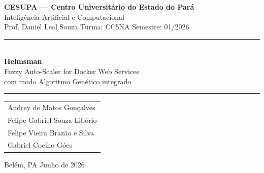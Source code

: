 \documentclass[12pt, a4paper]{article}
\begin{document}
\begin{titlepage}
  \thispagestyle{empty}
  \centering

  \vspace*{1.5cm}
  {\Large \textbf{CESUPA — Centro Universitário do Estado do Pará}}\\[0.5cm]
  {\large Inteligência Artificial e Computacional}\\[0.2cm]
  {\large Prof. Daniel Leal Souza \hspace{1cm} Turma: CC5NA \hspace{1cm} Semestre: 01/2026}

  \vspace{3cm}
  \rule{\linewidth}{0.5pt}\\[0.5cm]
  {\LARGE \textbf{Helmsman}}\\[0.4cm]
  {\Large Fuzzy Auto-Scaler for Docker Web Services}\\[0.3cm]
  {\large com modo Algoritmo Genético integrado}\\[0.5cm]
  \rule{\linewidth}{0.5pt}

  \vspace{3cm}
  \begin{tabular}{l}
    Andrey de Matos Gonçalves \\[0.3cm]
    Felipe Gabriel Souza Libório \\[0.3cm]
    Felipe Vieira Brazão e Silva \\[0.3cm]
    Gabriel Coelho Góes \\
  \end{tabular}

  \vfill
  {\large Belém, PA \hspace{1cm} Junho de 2026}
\end{titlepage}
\end{document}
